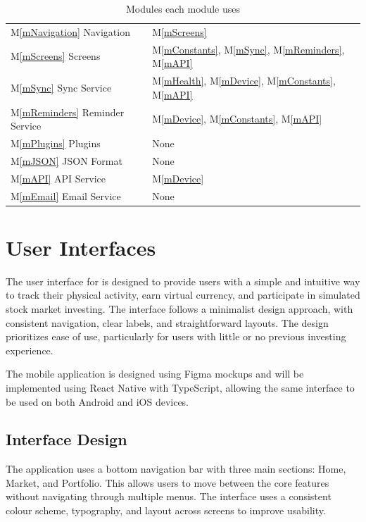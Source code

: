 \documentclass[12pt, titlepage]{article}
\newcommand{\mref}[1]{M\ref{#1}}
\begin{document}
\begin{table}[H]
\begin{tabular}{p{} p{}}
\mref{mNavigation} Navigation & \mref{mScreens}\\
\mref{mScreens} Screens & \mref{mConstants}, \mref{mSync}, \mref{mReminders}, \mref{mAPI}\\
\mref{mSync} Sync Service & \mref{mHealth}, \mref{mDevice}, \mref{mConstants}, \mref{mAPI}\\
\mref{mReminders} Reminder Service & \mref{mDevice}, \mref{mConstants}, \mref{mAPI}\\
\mref{mPlugins} Plugins & None\\
\mref{mJSON} JSON Format & None\\
\mref{mAPI} API Service & \mref{mDevice}\\
\mref{mEmail} Email Service & None\\
\bottomrule
\end{tabular}
\caption{Modules each module uses}
\label{TblUses}
\end{table}


\section{User Interfaces}

The user interface for \progname{} is designed to provide users with
a simple and intuitive way to track their physical activity, earn
virtual currency, and participate in simulated stock market investing.
The interface follows a minimalist design approach, with consistent
navigation, clear labels, and straightforward layouts. The design
prioritizes ease of use, particularly for users with little or no
previous investing experience.

The mobile application is designed using Figma mockups and will be
implemented using React Native with TypeScript, allowing the same
interface to be used on both Android and iOS devices.

\subsection{Interface Design}

The application uses a bottom navigation bar with three main sections:
Home, Market, and Portfolio. This allows users to move between the
core features without navigating through multiple menus. The
interface uses a consistent colour scheme, typography, and layout
across screens to improve usability.
\end{document}
